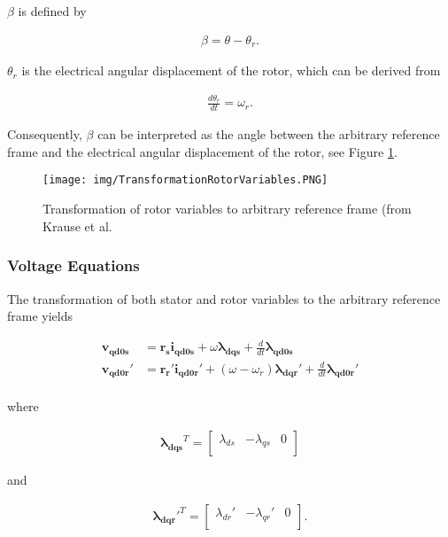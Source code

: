 \begin{flushleft}
$\beta$ is defined by

\begin{align*}
\beta = \theta - \theta_{r}. 
\end{align*}

$\theta_{r}$ is the electrical angular displacement of the rotor, which can be derived from

\begin{align*}
\frac{d\theta_{r}}{dt} = \omega_{r}.
\end{align*}

Consequently, $\beta$ can be interpreted as the angle between the arbitrary reference frame and the electrical angular displacement of the rotor, see Figure \ref{fig:TransformationRotor}.

\begin{figure}[h]
	\centering
	\texttt{[image: img/TransformationRotorVariables.PNG]} 
	\caption{Transformation of rotor variables to arbitrary reference frame (from Krause et al.}
	\label{fig:TransformationRotor}
\end{figure}

\newpage
\subsubsection{Voltage Equations}

The transformation of both stator and rotor variables to the arbitrary reference frame yields

\begin{align*}
\mathbf{v_{qd0s}} &= \mathbf{r_s} \mathbf{i_{qd0s}} + \omega\mathbf{\lambda_{dqs}} + \frac{d}{dt} \mathbf{\lambda_{qd0s}} \\
\mathbf{v_{qd0r}'} &= \mathbf{r_r'} \mathbf{i_{qd0r}'} + (\omega-\omega_{r})\mathbf{\lambda_{dqr}'} + \frac{d}{dt} \mathbf{\lambda_{qd0r}'} \\
\end{align*}

where

\begin{align*}
\mathbf{\lambda_{dqs}}^T = 
\begin{bmatrix}
\lambda_{ds} & -\lambda_{qs} & 0 \\
\end{bmatrix}
\end{align*}

and

\begin{align*}
\mathbf{\lambda_{dqr}'}^T = 
\begin{bmatrix}
\lambda_{dr}' & -\lambda_{qr}' & 0 \\
\end{bmatrix}.
\end{align*}


\end{flushleft}
